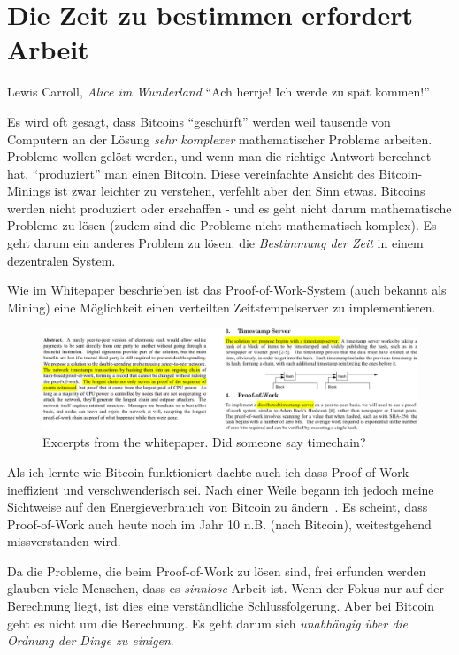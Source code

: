 \chapter{Die Zeit zu bestimmen erfordert Arbeit}
\label{les:17}

\begin{chapquote}{Lewis Carroll, \textit{Alice im Wunderland}}
\enquote{Ach herrje! Ich werde zu spät kommen!}
\end{chapquote}

Es wird oft gesagt, dass Bitcoins \enquote{geschürft} werden weil tausende von
Computern an der Lösung \textit{sehr komplexer} mathematischer Probleme
arbeiten. Probleme wollen gelöst werden, und wenn man die richtige Antwort
berechnet hat, \enquote{produziert} man einen Bitcoin. Diese vereinfachte
Ansicht des Bitcoin-Minings ist zwar leichter zu verstehen, verfehlt aber den
Sinn etwas. Bitcoins werden nicht produziert oder erschaffen - und es geht nicht
darum mathematische Probleme zu lösen (zudem sind die Probleme nicht
mathematisch komplex). Es geht darum ein anderes Problem zu lösen: die
\textit{Bestimmung der Zeit} in einem dezentralen System.

Wie im Whitepaper beschrieben ist das Proof-of-Work-System (auch bekannt als
Mining) eine Möglichkeit einen verteilten Zeitstempelserver zu implementieren.

\begin{figure}
  \includegraphics{assets/images/bitcoin-whitepaper-timestamp-wide.png}
  \caption{Excerpts from the whitepaper. Did someone say timechain?}
  \label{fig:bitcoin-whitepaper-timestamp-wide}
\end{figure}

Als ich lernte wie Bitcoin funktioniert dachte auch ich dass Proof-of-Work
ineffizient und verschwenderisch sei. Nach einer Weile begann ich jedoch meine
Sichtweise auf den Energieverbrauch von Bitcoin zu ändern~\cite{gigi:energy}. Es
scheint, dass Proof-of-Work auch heute noch im Jahr 10 n.B. (nach Bitcoin),
weitestgehend missverstanden wird.

Da die Probleme, die beim Proof-of-Work zu lösen sind, frei erfunden werden
glauben viele Menschen, dass es \textit{sinnlose} Arbeit ist. Wenn der Fokus nur
auf der Berechnung liegt, ist dies eine verständliche Schlussfolgerung. Aber bei
Bitcoin geht es nicht um die Berechnung. Es geht darum sich \textit{unabhängig
über die Ordnung der Dinge zu einigen}.


